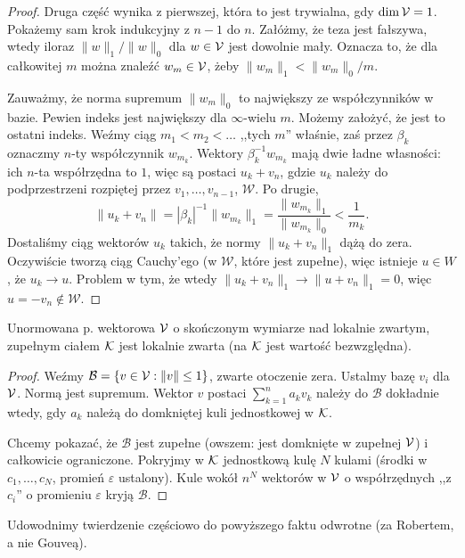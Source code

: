 \begin{proof}
	Druga część wynika z pierwszej, która to jest trywialna, gdy $\dim \mathcal V =1$.
	Pokażemy sam krok indukcyjny z $n-1$ do $n$.
	Załóżmy, że teza jest fałszywa, wtedy iloraz $\|w\|_1 / \|w\|_0$ dla $w \in \mathcal V$ jest dowolnie mały.
	Oznacza to, że dla całkowitej $m$ można znaleźć $w_m \in \mathcal V$, żeby $\|w_m\|_1 < \|w_m\|_0/m$.

	Zauważmy, że norma supremum $\|w_m\|_0$ to największy ze współczynników w bazie.
	Pewien indeks jest największy dla $\infty$-wielu $m$.
	Możemy założyć, że jest to ostatni indeks.
	Weźmy ciąg $m_1 <  m_2 < \dots$ ,,tych $m$'' właśnie, zaś przez $\beta_k$ oznaczmy $n$-ty współczynnik $w_{m_k}$.
	Wektory $\beta_k^{-1} w_{m_k}$ mają dwie ładne własności: ich $n$-ta współrzędna to $1$, więc są postaci $u_k + v_n$, gdzie $u_k$ należy do podprzestrzeni rozpiętej przez $v_1, \dots, v_{n-1}$, $\mathcal W$.
	Po drugie,
	\[
		\|u_k + v_n\| = |\beta_k|^{-1} \|w_{m_k}\|_1 = \frac{\|w_{m_k}\|_1}{\|w_{m_k}\|_0} < \frac 1 {m_k}.
	\]
	Dostaliśmy ciąg wektorów $u_k$ takich, że normy $\|u_k + v_n\|_1$ dążą do zera.
	Oczywiście tworzą ciąg Cauchy'ego (w $\mathcal W$, które jest zupełne), więc istnieje $u \in W$, że $u_k \to u$.
	Problem w tym, że wtedy $\|u_k + v_n\|_1 \to \|u + v_n\|_1 = 0$, więc $u = -v_n \not \in \mathcal W$.
\end{proof}

\begin{fakt}
	Unormowana p. wektorowa $\mathcal V$ o skończonym wymiarze nad lokalnie zwartym, zupełnym ciałem $\mathcal K$ jest lokalnie zwarta (na $\mathcal K$ jest wartość bezwzględna).
\end{fakt}

\begin{proof}
	Weźmy $\mathcal B = \{v \in \mathcal V : \|v\| \le 1\}$, zwarte otoczenie zera.
	Ustalmy bazę $v_i$ dla $\mathcal V$.
	Normą jest supremum.
	Wektor $v$ postaci $\sum_{k=1}^n a_k v_k$ należy do $\mathcal B$ dokładnie wtedy, gdy $a_k$ należą do domkniętej kuli jednostkowej w $\mathcal K$.

	Chcemy pokazać, że $\mathcal B$ jest zupełne (owszem: jest domknięte w zupełnej $\mathcal V$) i całkowicie ograniczone.
	Pokryjmy w $\mathcal K$ jednostkową kulę $N$ kulami (środki w $c_1, \dots, c_N$, promień $\varepsilon$ ustalony).
	Kule wokół $n^N$ wektorów w $\mathcal V$ o współrzędnych ,,z $c_i$'' o promieniu $\varepsilon$ kryją $\mathcal B$. 
\end{proof}

Udowodnimy twierdzenie częściowo do powyższego faktu odwrotne (za Robertem, a nie Gouveą).

